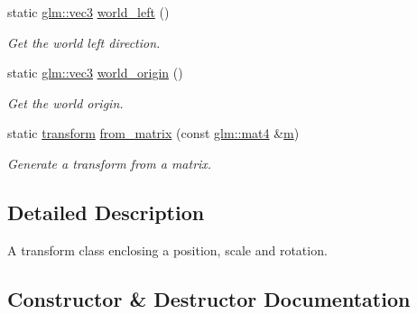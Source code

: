 \begin{DoxyCompactItemize}
static \mbox{\hyperlink{namespacemoka_aed2224bc0e5b79e57a8975ded94ee1aaa97ade28e93c0de60adc075bdbe07ca36}{glm\+::vec3}} \mbox{\hyperlink{classmoka_1_1transform_a510f66a2be7fc5194417ed82262842c2}{world\+\_\+left}} ()
\begin{DoxyCompactList}\small\item\em Get the world left direction. \end{DoxyCompactList}\item 
static \mbox{\hyperlink{namespacemoka_aed2224bc0e5b79e57a8975ded94ee1aaa97ade28e93c0de60adc075bdbe07ca36}{glm\+::vec3}} \mbox{\hyperlink{classmoka_1_1transform_ab952e9b252cd2f5a0256e1aa0c9743c0}{world\+\_\+origin}} ()
\begin{DoxyCompactList}\small\item\em Get the world origin. \end{DoxyCompactList}\item 
static \mbox{\hyperlink{classmoka_1_1transform}{transform}} \mbox{\hyperlink{classmoka_1_1transform_a5bbbfa2b9efaeda3d2c11c6f16decf7e}{from\+\_\+matrix}} (const \mbox{\hyperlink{namespacemoka_aed2224bc0e5b79e57a8975ded94ee1aaabe14b41eb96410ea28b32bc138d885ae}{glm\+::mat4}} \&\mbox{\hyperlink{namespacemoka_a45a36b05a9b9eddb028d6c60305ae71da6f8f57715090da2632453988d9a1501b}{m}})
\begin{DoxyCompactList}\small\item\em Generate a transform from a matrix. \end{DoxyCompactList}\end{DoxyCompactItemize}


\subsection{Detailed Description}
A transform class enclosing a position, scale and rotation. 

\subsection{Constructor \& Destructor Documentation}
\mbox{\label{classmoka_1_1transform_aa6b24d02e183f22c5ae6a558f3b30c97}} 
